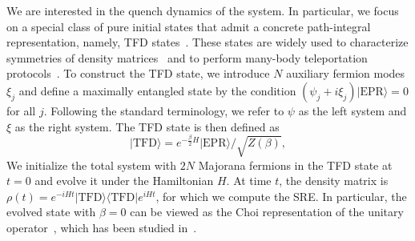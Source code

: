 \documentclass[aps,prl,twocolumn,superscriptaddress,longbibliography]{revtex4-2}
\begin{document}
  We are interested in the quench dynamics of the system. In particular, we focus on a special class of pure initial states that admit a concrete path-integral representation, namely, TFD states~\cite{Israel:1976ur,Maldacena:2001kr}. These states are widely used to characterize symmetries of density matrices~\cite{Liu:2024mme,Weinstein:2024fug} and to perform many-body teleportation protocols~\cite{Gao:2016bin,Maldacena:2017axo,Susskind:2017nto,Gao:2018yzk,Brown:2019hmk,Gao:2019nyj,Schuster:2021uvg,Jafferis:2022crx,Zhou:2024osg,Liu:2024nhs}. To construct the TFD state, we introduce $N$ auxiliary fermion modes $\xi_j$ and define a maximally entangled state by the condition $(\psi_j+i\xi_j)\lvert\mathrm{EPR}\rangle=0$ for all $j$. Following the standard terminology, we refer to $\psi$ as the left system and $\xi$ as the right system. The TFD state is then defined as~\cite{Gu:2017njx}
  \begin{equation}
  |\text{TFD}\rangle=e^{-\frac{\beta}{2}H}\lvert\mathrm{EPR}\rangle/\sqrt{Z(\beta)},
  \end{equation}
  We initialize the total system with $2N$ Majorana fermions in the TFD state at $t=0$ and evolve it under the Hamiltonian $H$. At time $t$, the density matrix is $\rho(t)=e^{-iHt}\lvert\mathrm{TFD}\rangle\langle\mathrm{TFD}\rvert e^{iHt}$, for which we compute the SRE. In particular, the evolved state with $\beta=0$ can be viewed as the Choi representation of the unitary operator~\cite{Choi:1975nug}, which has been studied in~\cite{Hou:2025bau}.
\end{document}
